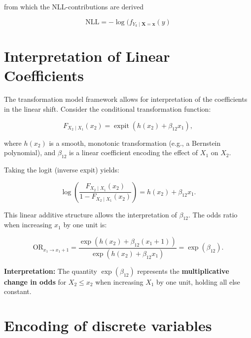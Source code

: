 from which the NLL-contributions are derived

\begin{equation}
\text{NLL} = - \log (f_{Y_k \mid \mathbf{X} = \mathbf{x}}(y)
\end{equation}


\section{Interpretation of Linear Coefficients} \label{sec:interpretation_linear_coefficients}

The transformation model framework allows for interpretation of the coefficients in the linear shift. Consider the conditional transformation function:

\begin{equation}
F_{X_2 \mid X_1}(x_2) = \operatorname{expit}( h(x_2) + \beta_{12} x_1 ),
\end{equation}

where \( h(x_2) \) is a smooth, monotonic transformation (e.g., a Bernstein polynomial), and \( \beta_{12} \) is a linear coefficient encoding the effect of \( X_1 \) on \( X_2 \).

Taking the logit (inverse expit) yields:

\begin{equation}
\log\left( \frac{F_{X_2 \mid X_1}(x_2)}{1 - F_{X_2 \mid X_1}(x_2)} \right)
= h(x_2) + \beta_{12} x_1.
\end{equation}

This linear additive structure allows the interpretation of \( \beta_{12} \). The odds ratio when increasing \( x_1 \) by one unit is:

\begin{equation}
\text{OR}_{x_1 \to x_1 + 1} = 
\frac{\exp(h(x_2) + \beta_{12}(x_1 + 1))}{\exp(h(x_2) + \beta_{12} x_1)} 
= \exp(\beta_{12}).
\end{equation}

\noindent\textbf{Interpretation:} The quantity \( \exp(\beta_{12}) \) represents the \textbf{multiplicative change in odds} for \( X_2 \le x_2 \) when increasing \( X_1 \) by one unit, holding all else constant.



\section{Encoding of discrete variables} \label{sec:encoding_discrete_variables}

